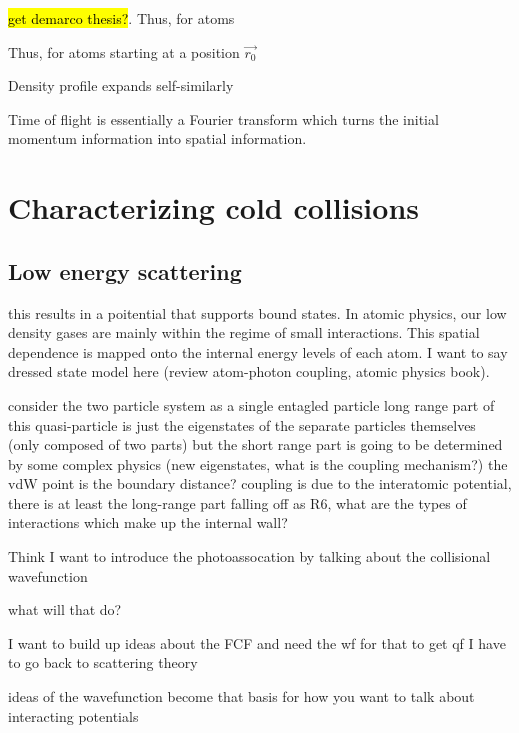  \cite{Ketterle1999} \hl{get demarco thesis?}. Thus, for atoms 

Thus, for atoms starting at a position $\vec{r_0}$ 

Density profile expands self-similarly 

Time of flight is essentially a Fourier transform which turns the initial momentum information into spatial information.



\section{Characterizing cold collisions} \label{sec:cold_collisions}



\subsection{Low energy scattering} \label{ssec:scattering}

this results in a poitential that supports bound states. 
In atomic physics, our low density gases are mainly within the regime of small interactions. 
This spatial dependence is mapped onto the internal energy levels of each atom. I want to say dressed state model here (review atom-photon coupling, atomic physics book).

consider the two particle system as a single entagled particle
	long range part of this quasi-particle is just the eigenstates of the separate particles themselves (only composed of two parts)
	but the short range part is going to be determined by some complex physics (new eigenstates, what is the coupling mechanism?)
		the vdW point is the boundary distance?
		coupling is due to the interatomic potential, there is at least the long-range part falling off as R6, what are the types of interactions which make up the internal wall?


Think I want to introduce the photoassocation by talking about the collisional wavefunction

what will that do?

I want to build up ideas about the FCF and need the wf for that
	to get qf I have to go back to scattering theory

ideas of the wavefunction become that basis for how you want to talk about interacting potentials


